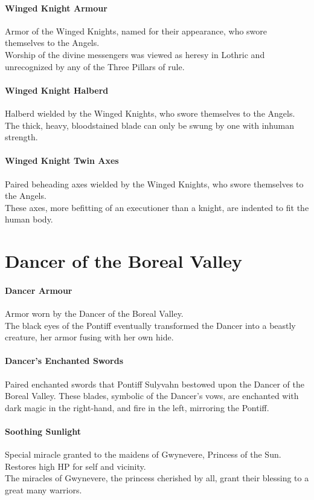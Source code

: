 \documentclass[twocolumn,a4paper]{article}
\begin{document}
\paragraph{Winged Knight Armour}
Armor of the Winged Knights, named for their appearance, who swore themselves to the Angels.\\
Worship of the divine messengers was viewed as heresy in Lothric and unrecognized by any of the Three Pillars of rule.
\paragraph{Winged Knight Halberd}
Halberd wielded by the Winged Knights, who swore themselves to the Angels.\\
The thick, heavy, bloodstained blade can only be swung by one with inhuman strength.
\paragraph{Winged Knight Twin Axes}
Paired beheading axes wielded by the Winged Knights, who swore themselves to the Angels.\\
These axes, more befitting of an executioner than a knight, are indented to fit the human body.
\section*{Dancer of the Boreal Valley}
\paragraph{Dancer Armour}
Armor worn by the Dancer of the Boreal Valley.\\
The black eyes of the Pontiff eventually transformed the Dancer into a beastly creature, her armor fusing with her own hide.
\paragraph{Dancer's Enchanted Swords}
Paired enchanted swords that Pontiff Sulyvahn bestowed upon the Dancer of the Boreal Valley.
These blades, symbolic of the Dancer's vows, are enchanted with dark magic in the right-hand, and fire in the left, mirroring the Pontiff.
\paragraph{Soothing Sunlight}
Special miracle granted to the maidens of Gwynevere, Princess of the Sun. Restores high HP for self and vicinity.\\
The miracles of Gwynevere, the princess cherished by all, grant their blessing to a great many warriors.
\end{document}
